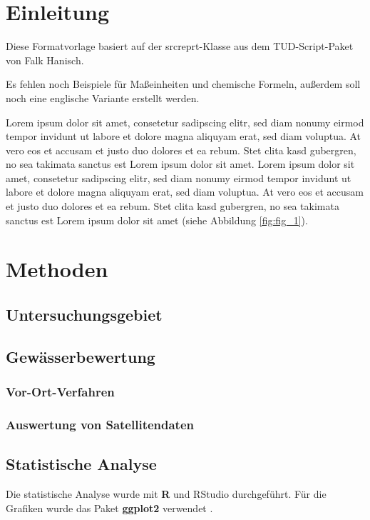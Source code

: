 \documentclass[english,ngerman,BCOR=6mm,cdgeometry=no,DIV=13]{tudscrreprt}
\begin{document}
\chapter{Einleitung}

Diese Formatvorlage basiert auf der srcreprt-Klasse aus dem TUD-Script-Paket von
Falk Hanisch.

Es fehlen noch Beispiele für Maßeinheiten und chemische Formeln, außerdem soll
noch eine englische Variante erstellt werden.

Lorem ipsum dolor sit amet, consetetur sadipscing elitr, sed diam nonumy eirmod
tempor invidunt ut labore et dolore magna aliquyam erat, sed diam voluptua. At
vero eos et accusam et justo duo dolores et ea rebum. Stet clita kasd gubergren,
no sea takimata sanctus est Lorem ipsum dolor sit amet. Lorem ipsum dolor sit
amet, consetetur sadipscing elitr, sed diam nonumy eirmod tempor invidunt ut
labore et dolore magna aliquyam erat, sed diam voluptua. At vero eos et accusam
et justo duo dolores et ea rebum. Stet clita kasd gubergren, no sea takimata
sanctus est Lorem ipsum dolor sit amet (siehe Abbildung \ref{fig:fig_1}).

\chapter{Methoden}

\section{Untersuchungsgebiet}

\section{Gewässerbewertung}

\subsection{Vor-Ort-Verfahren}

\subsection{Auswertung von Satellitendaten}

\section{Statistische Analyse}

Die statistische Analyse wurde mit \textbf{R} \parencite{r-core-2024} und RStudio
\parencite{rstudio-2024} durchgeführt. Für die Grafiken
wurde das Paket \textbf{ggplot2} verwendet \parencite{wickham-ggplot2-2016}.
\end{document}
